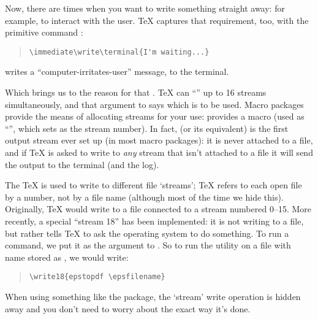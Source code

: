 Now, there are times when you want to write something straight away:
for example, to interact with the user.  \TeX{} captures that
requirement, too, with the primitive command :
\begin{quote}
\begin{verbatim}
\immediate\write\terminal{I'm waiting...}
\end{verbatim}
\end{quote}
writes a ``computer-irritates-user'' message, to the terminal.

Which brings us to the reason for that .  \TeX{} can
``'' up to 16 streams simultaneously, and that argument to
 says which is to be used.  Macro packages provide the
means of allocating streams for your use: \plaintex{} provides a macro
 (used as ``'', which sets
 as the stream number).  In fact,  (or
its equivalent) is the first output stream ever set up (in most macro
packages): it is never attached to a file, and if \TeX{} is asked to
write to \emph{any} stream that isn't attached to a file it will send
the output to the terminal (and the log).


The \TeX{}  is used
to write to different file `streams'; TeX refers to each open file by
a number, not by a file name (although most of the time we hide this).
Originally, \TeX{} would write to a file connected to a stream
numbered 0--15.  More recently, a special ``stream 18'' has been
implemented: it is not writing to a file, but rather tells TeX to ask
the operating system to do something.  To run a command, we put it as
the argument to .  So to run the 
utility on a file with name stored as , we would
write:
\begin{quote}
\begin{verbatim}
\write18{epstopdf \epsfilename}
\end{verbatim}
\end{quote}
When using something like the  package, the `stream'
write operation is hidden away and you don't need to worry about the
exact way it's done.

